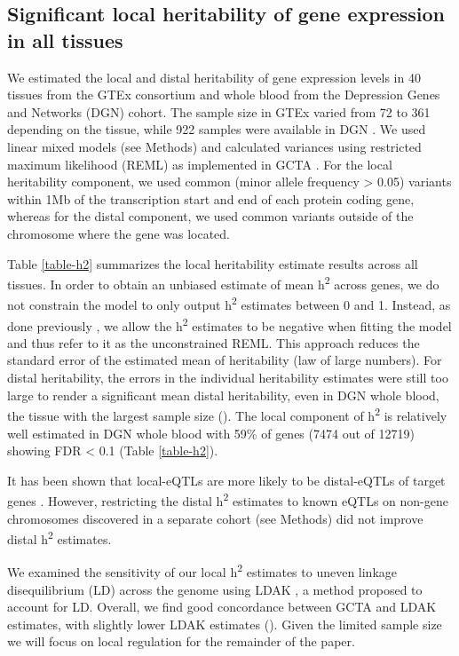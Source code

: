 \documentclass[10pt,letterpaper]{article}
\begin{document}
\subsection*{Significant local heritability of gene expression in all tissues}\label{local-genetic-variation-can-be-well-characterized-for-all-tissues}

We estimated the local and distal heritability of gene expression levels in 40 tissues from the GTEx consortium and whole blood from the Depression Genes and Networks (DGN) cohort. The sample size in GTEx varied from 72 to 361 depending on the tissue, while 922 samples were available in DGN \cite{Battle_2013}. We used linear mixed models (see Methods) and calculated variances using restricted maximum likelihood (REML) as implemented in GCTA \cite{Yang_2011}. For the local heritability component, we used common (minor allele frequency \textgreater{} 0.05) variants within 1Mb of the transcription start and end of each protein coding gene, whereas for the distal component, we used common variants outside of the chromosome where the gene was located.

Table \ref{table-h2} summarizes the local heritability estimate results across all tissues. In order to obtain an unbiased estimate of mean h\textsuperscript{2} across genes, we do not constrain the model to only output h\textsuperscript{2} estimates between 0 and 1. Instead, as done previously \cite{Price_2011,Wright_2014}, we allow the h\textsuperscript{2} estimates to be negative when fitting the model and thus refer to it as the unconstrained REML. This approach reduces the standard error of the estimated mean of heritability (law of large numbers). For distal heritability, the errors in the individual heritability estimates were still too large to render a significant mean distal heritability, even in DGN whole blood, the tissue with the largest sample size (). The local component of h\textsuperscript{2} is relatively well estimated in DGN whole blood with 59\% of genes  (7474 out of 12719) showing FDR \textless{} 0.1 (Table \ref{table-h2}).

It has been shown that local-eQTLs are more likely to be distal-eQTLs of target genes \cite{pierce2014mediation}. However, restricting the distal h\textsuperscript{2} estimates to known eQTLs  on non-gene chromosomes discovered in a separate cohort (see Methods) did not improve distal h\textsuperscript{2} estimates. 

We examined the sensitivity of our local h\textsuperscript{2} estimates to uneven linkage disequilibrium (LD) across the genome using LDAK \cite{speed2012improved}, a method proposed to account for LD. Overall, we find good concordance between GCTA and LDAK estimates, with slightly lower LDAK estimates (). Given the limited sample size we will focus on local regulation for the remainder of the paper.
\end{document}
